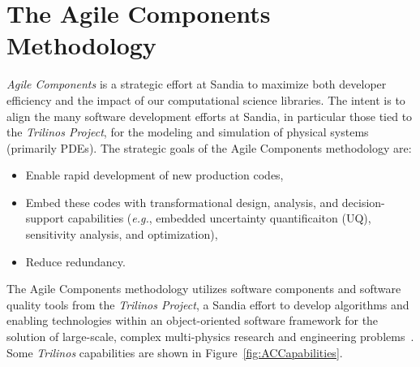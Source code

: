 \documentclass[10pt]{article}
\theoremstyle{plain}
\theoremstyle{definition}
\theoremstyle{remark}
\numberwithin{equation}{section}
\begin{document}
\section{The Agile Components Methodology}

\emph{Agile Components} is a strategic effort at Sandia to maximize both developer efficiency and the impact of our computational science libraries. The intent is to align the many software development efforts at Sandia, in particular those tied to the \emph{Trilinos Project}, for the modeling and simulation of physical systems (primarily PDEs). The strategic goals of the Agile Components methodology are:
\begin{itemize}
  \item Enable rapid development of new production codes,
  \item Embed these codes with transformational design, analysis, and decision-support capabilities ({\it e.g.}, embedded uncertainty quantificaiton (UQ), sensitivity analysis, and optimization),
  \item Reduce redundancy.
\end{itemize}

The Agile Components methodology utilizes software components and software quality tools from the \emph{Trilinos Project}, a Sandia effort to develop algorithms and enabling technologies within an object-oriented software framework for the solution of large-scale, complex multi-physics research and engineering problems~\cite{Trilinos-Overview}. Some \emph{Trilinos} capabilities are shown in Figure~\ref{fig:ACCapabilities}.
\end{document}
